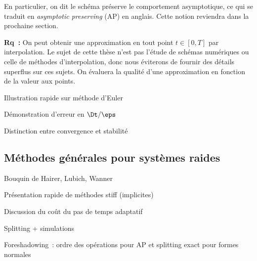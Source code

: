 \bigskip\bigskip\bigskip
En particulier, on dit le schéma préserve le comportement asymptotique, 
ce qui se traduit en \textit{asymptotic preserving} (AP) en anglais.
Cette notion reviendra dans la prochaine section. 



\bigskip\bigskip\bigskip
\textbf{Rq~:} On peut obtenir une approximation en tout point $t \in
[0,T]$ par interpolation. Le sujet de cette thèse n'est pas l'étude de
schémas numériques ou celle de méthodes d'interpolation, donc nous 
éviterons de fournir des détails superflus sur ces sujets. On évaluera
la qualité d'une approximation en fonction de la valeur aux points. 

Illustration rapide sur méthode d'Euler

Démonstration d'erreur en $\Dt/\eps$

Distinction entre convergence et stabilité



\subsection*{Méthodes générales pour systèmes raides}

Bouquin de Hairer, Lubich, Wanner

Présentation rapide de méthodes stiff (implicites)

Discussion du coût du pas de temps adaptatif

Splitting + simulations

Foreshadowing~: ordre des opérations pour AP et splitting exact pour
formes normales